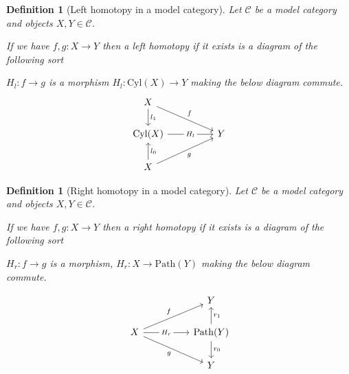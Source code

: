 \documentclass[12pt]{report}
\numberwithin{equation}{section}
\newtheorem{definition}[dummy]{Definition}
\begin{document}
	
	\begin{definition}[Left homotopy in a model category]
		Let $\mathcal{C}$ be a model category and objects $X,Y \in \mathcal{C}$.
		
		If we have \( f, g: X \to Y \) then a left homotopy if it exists is a diagram of the following sort 
		
		\( H_l: f \rightarrow g \) is a morphism \( H_l: \mathrm{Cyl}(X) \to Y \) making the below diagram commute.
		\[\begin{tikzcd}
			X \\
			{\mathrm{Cyl}(X)} && Y \\
			X
			\arrow["{l_1}", from=1-1, to=2-1]
			\arrow["f", from=1-1, to=2-3]
			\arrow["{H_l}"{description}, from=2-1, to=2-3]
			\arrow["{l_0}"', from=3-1, to=2-1]
			\arrow["g"', from=3-1, to=2-3]
		\end{tikzcd}\]
		
	\end{definition}
	\begin{definition}[Right homotopy in a model category]
		Let $\mathcal{C}$ be a model category and objects $X,Y \in \mathcal{C}$.
		
		If we have \( f, g: X \to Y \) then a right homotopy if it exists is a diagram of the following sort 
		
		\( H_r: f \rightarrow g \) is a morphism, \( H_r: X \to \mathrm{Path}(Y) \) making the below diagram commute.
	
		\[\begin{tikzcd}
			&& Y \\
			X && {\mathrm{Path}(Y)} \\
			&& Y
			\arrow["{r_1}"', from=2-3, to=1-3]
			\arrow["f", from=2-1, to=1-3]
			\arrow["{H_r}"{description}, from=2-1, to=2-3]
			\arrow["g"', from=2-1, to=3-3]
			\arrow["{r_0}", from=2-3, to=3-3]
		\end{tikzcd}\]
	\end{definition}
	
\end{document}
